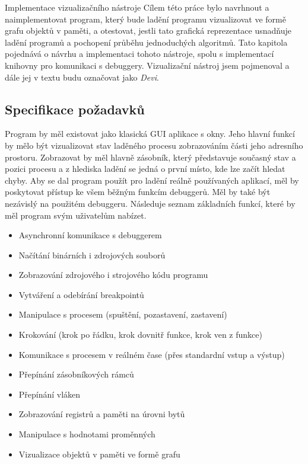 \documentclass[bc,male,python,dept460]{diploma}						%
\begin{document}
\begin{section}{Implementace vizualizačního nástroje}
\label{sec:DeviImplementation}
  Cílem této práce bylo navrhnout a naimplementovat program, který bude ladění programu vizualizovat ve formě grafu objektů v paměti, a otestovat,
	jestli tato grafická reprezentace usnadňuje ladění programů a pochopení průběhu jednoduchých algoritmů.
	Tato kapitola pojednává o návrhu a implementaci tohoto nástroje, spolu s implementací knihovny pro komunikaci s debuggery.
	Vizualizační nástroj jsem pojmenoval a dále jej v textu budu označovat jako \textit{Devi}.
	
	\subsection{Specifikace požadavků}
	Program by měl existovat jako klasická GUI aplikace s okny. Jeho hlavní funkcí by mělo být vizualizovat stav laděného procesu zobrazováním části jeho
	adresního prostoru. Zobrazovat by měl hlavně zásobník, který představuje současný stav a pozici procesu a z hlediska ladění se jedná o první místo,
	kde lze začít hledat chyby.
	Aby se dal program použít pro ladění reálně používaných aplikací, měl by poskytovat přístup ke všem běžným
	funkcím debuggerů. Měl by také být nezávislý na použitém debuggeru. Následuje seznam základních funkcí, které by měl program svým uživatelům nabízet.
	
	\begin{itemize}
		\item Asynchronní komunikace s debuggerem
		\item Načítání binárních i zdrojových souborů
		\item Zobrazování zdrojového i strojového kódu programu
		\item Vytváření a odebírání breakpointů
		\item Manipulace s procesem (spuštění, pozastavení, zastavení)
		\item Krokování (krok po řádku, krok dovnitř funkce, krok ven z funkce)
		\item Komunikace s procesem v reálném čase (přes standardní vstup a výstup)
		\item Přepínání zásobníkových rámců
		\item Přepínání vláken
		\item Zobrazování registrů a paměti na úrovni bytů
		\item Manipulace s hodnotami proměnných
		\item Vizualizace objektů v paměti ve formě grafu
	\end{itemize}
	

\end{section}
\end{document}
